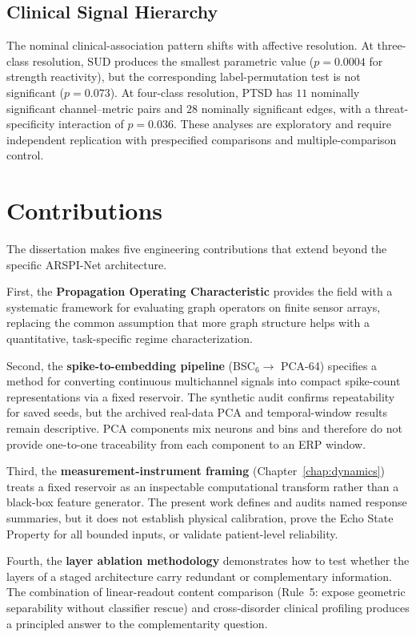 \subsection{Clinical Signal Hierarchy}

The nominal clinical-association pattern shifts with affective resolution. At three-class resolution, SUD produces the smallest parametric value ($p = 0.0004$ for strength reactivity), but the corresponding label-permutation test is not significant ($p = 0.073$). At four-class resolution, PTSD has $11$ nominally significant channel--metric pairs and $28$ nominally significant edges, with a threat-specificity interaction of $p = 0.036$. These analyses are exploratory and require independent replication with prespecified comparisons and multiple-comparison control.


\section{Contributions}

The dissertation makes five engineering contributions that extend beyond the specific ARSPI-Net architecture.

First, the \textbf{Propagation Operating Characteristic} provides the field with a systematic framework for evaluating graph operators on finite sensor arrays, replacing the common assumption that more graph structure helps with a quantitative, task-specific regime characterization.

Second, the \textbf{spike-to-embedding pipeline} (BSC$_6 \to$ PCA-64) specifies a method for converting continuous multichannel signals into compact spike-count representations via a fixed reservoir. The synthetic audit confirms repeatability for saved seeds, but the archived real-data PCA and temporal-window results remain descriptive. PCA components mix neurons and bins and therefore do not provide one-to-one traceability from each component to an ERP window.

Third, the \textbf{measurement-instrument framing} (Chapter~\ref{chap:dynamics}) treats a fixed reservoir as an inspectable computational transform rather than a black-box feature generator. The present work defines and audits named response summaries, but it does not establish physical calibration, prove the Echo State Property for all bounded inputs, or validate patient-level reliability.

Fourth, the \textbf{layer ablation methodology} demonstrates how to test whether the layers of a staged architecture carry redundant or complementary information. The combination of linear-readout content comparison (Rule~5: expose geometric separability without classifier rescue) and cross-disorder clinical profiling produces a principled answer to the complementarity question.

